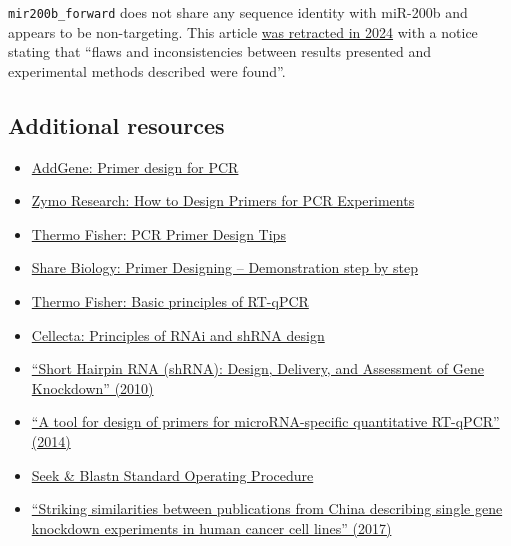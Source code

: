 \documentclass[letterpaper, 12pt]{article}
\begin{document}
\verb|mir200b_forward| does not share any sequence identity with miR-200b and appears to be non-targeting. This article \href{https://doi.org/10.1002/jcb.30555}{was retracted in 2024} with a notice stating that ``flaws and inconsistencies between results presented and experimental methods described were found''.

\subsection*{Additional resources}

\begin{itemize}
    \setlength\itemsep{-0.5em}
    \item \href{https://www.addgene.org/protocols/primer-design/}{AddGene: Primer design for PCR}
    \item \href{https://www.zymoresearch.com/blogs/blog/how-to-design-primers-for-pcr-experiments}{Zymo Research: How to Design Primers for PCR Experiments}
    \item \href{https://www.thermofisher.com/blog/behindthebench/pcr-primer-design-tips/}{Thermo Fisher: PCR Primer Design Tips}
    \item \href{https://sharebiology.com/primer-designing-demonstration-step-by-step/}{Share Biology: Primer Designing – Demonstration step by step}
    \item \href{https://www.thermofisher.com/us/en/home/brands/thermo-scientific/molecular-biology/molecular-biology-learning-center/molecular-biology-resource-library/spotlight-articles/basic-principles-rt-qpcr.html}{Thermo Fisher: Basic principles of RT-qPCR}
    \item \href{https://cellecta.com/pages/principles-of-rnai-and-shrna-design}{Cellecta: Principles of RNAi and shRNA design}
    \item \href{https://doi.org/10.1007/978-1-60761-657-3_10}{``Short Hairpin RNA (shRNA): Design, Delivery, and Assessment of Gene Knockdown'' (2010)}
    \item \href{https://doi.org/10.1186/1471-2105-15-29}{``A tool for design of primers for microRNA-specific quantitative RT-qPCR'' (2014)}
    \item \href{https://dx.doi.org/10.17504/protocols.io.bjhpkj5n}{Seek \& Blastn Standard Operating Procedure}
    \item \href{https://doi.org/10.1007/s11192-016-2209-6}{``Striking similarities between publications from China describing single gene knockdown experiments in human cancer cell lines'' (2017)}

\end{itemize}
\end{document}
